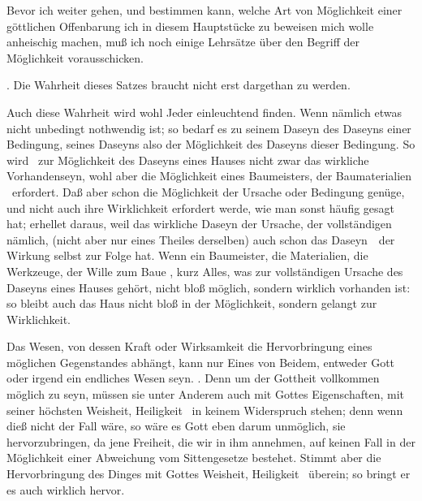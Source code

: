 Bevor ich weiter gehen, und bestimmen kann, welche Art von Möglichkeit einer göttlichen Offenbarung ich in diesem Hauptstücke zu beweisen mich wolle anheischig machen, muß ich noch einige Lehrsätze über den Begriff der Möglichkeit vorausschicken.
\begin{aufza}
\item {}. Die Wahrheit dieses Satzes braucht nicht erst dargethan zu werden.
\item {} Auch diese Wahrheit wird wohl Jeder einleuchtend finden. Wenn nämlich etwas nicht unbedingt nothwendig ist; so bedarf es zu seinem Daseyn des Daseyns einer Bedingung,  seines Daseyns also der Möglichkeit des Daseyns dieser Bedingung. So wird \zB\ zur Möglichkeit des Daseyns eines Hauses nicht zwar das wirkliche Vorhandenseyn, wohl aber die Möglichkeit eines Baumeisters, der Baumaterialien \usw\ erfordert. Daß aber schon die Möglichkeit der Ursache oder Bedingung genüge, und nicht auch ihre Wirklichkeit erfordert werde, wie man sonst häufig gesagt hat; erhellet daraus, weil das wirkliche Daseyn der Ursache, der vollständigen nämlich, (nicht aber nur eines Theiles derselben) auch schon das Daseyn~\ der Wirkung selbst zur Folge hat. Wenn ein Baumeister, die Materialien, die Werkzeuge, der Wille zum Baue \usw , kurz Alles, was zur vollständigen Ursache des Daseyns eines Hauses gehört, nicht bloß möglich, sondern wirklich vorhanden ist: so bleibt auch das Haus nicht bloß in der Möglichkeit, sondern gelangt zur Wirklichkeit.
\item Das Wesen, von dessen Kraft oder Wirksamkeit die Hervorbringung eines möglichen Gegenstandes abhängt, kann nur Eines von Beidem, entweder Gott oder irgend ein endliches Wesen seyn. . Denn um der Gottheit vollkommen möglich zu seyn, müssen sie unter Anderem auch mit Gottes Eigenschaften, mit seiner höchsten Weisheit, Heiligkeit \usw\ in keinem Widerspruch stehen; denn wenn dieß nicht der Fall wäre, so wäre es Gott eben darum unmöglich, sie hervorzubringen, da jene Freiheit, die wir in ihm annehmen, auf keinen Fall in der Möglichkeit einer Abweichung vom Sittengesetze bestehet. Stimmt aber die Hervorbringung des Dinges mit Gottes Weisheit, Heiligkeit \usw\ überein; so bringt er es auch wirklich hervor.

\end{aufza}
